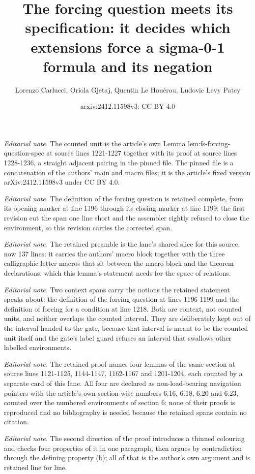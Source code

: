 \documentclass{article}
\title{The forcing question meets its specification: it decides which extensions force a sigma-0-1 formula and its negation}
\author{Lorenzo Carlucci, Oriola Gjetaj, Quentin Le Houérou, Ludovic Levy Patey}
\date{arxiv:2412.11598v3; CC BY 4.0}
\begin{document}
\maketitle
\noindent\textit{Editorial note.} The counted unit is the article's own Lemma lem:fs-forcing-question-spec at source lines 1221-1227 together with its proof at source lines 1228-1236, a straight adjacent pairing in the pinned file. The pinned file is a concatenation of the authors' main and macro files; it is the article's fixed version arXiv:2412.11598v3 under CC BY 4.0.\par\medskip
\noindent\textit{Editorial note.}  The definition of the forcing question is retained complete, from its opening marker at line 1196 through its closing marker at line 1199; the first revision cut the span one line short and the assembler rightly refused to close the environment, so this revision carries the corrected span.\par\medskip
\noindent\textit{Editorial note.} The retained preamble is the lane's shared slice for this source, now 137 lines: it carries the authors' macro block together with the three calligraphic letter macros that sit between the macro block and the theorem declarations, which this lemma's statement needs for the space of relations.\par\medskip
\noindent\textit{Editorial note.} Two context spans carry the notions the retained statement speaks about: the definition of the forcing question at lines 1196-1199 and the definition of forcing for a condition at line 1218. Both are context, not counted units, and neither overlaps the counted interval. They are deliberately kept out of the interval handed to the gate, because that interval is meant to be the counted unit itself and the gate's label guard refuses an interval that swallows other labelled environments.\par\medskip
\noindent\textit{Editorial note.} The retained proof names four lemmas of the same section at source lines 1121-1125, 1144-1147, 1162-1167 and 1201-1204, each counted by a separate card of this lane. All four are declared as non-load-bearing navigation pointers with the article's own section-wise numbers 6.16, 6.18, 6.20 and 6.23, counted over the numbered environments of section 6; none of their proofs is reproduced and no bibliography is needed because the retained spans contain no citation.\par\medskip
\noindent\textit{Editorial note.} The second direction of the proof introduces a thinned colouring and checks four properties of it in one paragraph, then argues by contradiction through the defining property (b); all of that is the author's own argument and is retained line for line.\par\medskip
\end{document}

